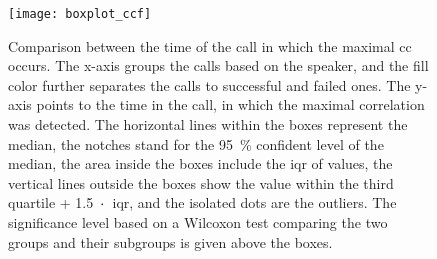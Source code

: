 \begin{figure}[t]
	\centering
	\texttt{[image: boxplot\_ccf]}
	\caption[Comparison between sales reps' and prospects' maximal \acl{cc} point in conversation for successful and failed calls.]
		{Comparison between the time of the call in which the maximal \acl{cc} occurs.
		The x-axis groups the calls based on the speaker, and the fill color further separates the calls to successful and failed ones.
		The y-axis points to the time in the call, in which the maximal correlation was detected.
		The horizontal lines within the boxes represent the median,
		the notches stand for the \SI{95}{\percent} confident level of the median, the area inside the boxes include the \acf{iqr} of values, the vertical lines outside the boxes show the value within the third quartile + 1.5~$\protect\cdot$~\ac{iqr}, and the isolated dots are the outliers.
		The significance level based on a Wilcoxon test comparing the two groups and their subgroups is given above the boxes.}
	\label{fig:barplot_conv_leaders}
\end{figure}
